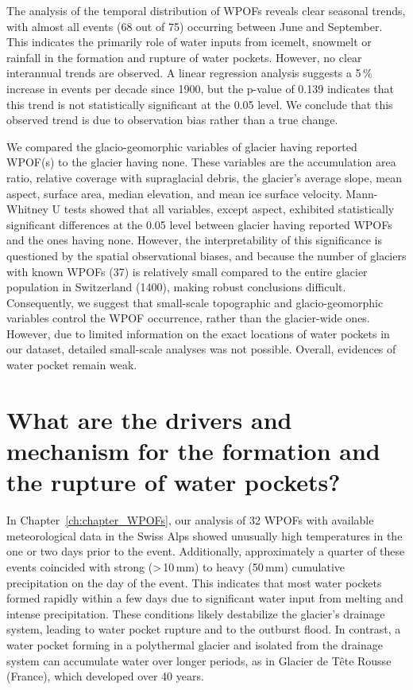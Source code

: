 The analysis of the temporal distribution of WPOFs reveals clear seasonal trends, with almost all events (68 out of 75) occurring between June and September. This indicates the primarily role of water inputs from icemelt, snowmelt or rainfall in the formation and rupture of water pockets. However, no clear interannual trends are observed. A linear regression analysis suggests a 5\,\% increase in events per decade since 1900, but the p-value of 0.139 indicates that this trend is not statistically significant at the 0.05 level. We conclude that this observed trend is due to observation bias rather than a true change.
%

We compared the glacio-geomorphic variables of glacier having reported WPOF(s) to the glacier having none. These variables are the accumulation area ratio, relative coverage with supraglacial debris, the glacier's average slope, mean aspect, surface area, median elevation, and mean ice surface velocity. Mann-Whitney U tests showed that all variables, except aspect, exhibited statistically significant differences at the 0.05 level between glacier having reported WPOFs and the ones having none. However, the interpretability of this significance is questioned by the spatial observational biases, and because the number of glaciers with known WPOFs (37) is relatively small compared to the entire glacier population in Switzerland (1400), making robust conclusions difficult. Consequently, we suggest that small-scale topographic and glacio-geomorphic variables control the WPOF occurrence, rather than the glacier-wide ones. However, due to limited information on the exact locations of water pockets in our dataset, detailed small-scale analyses was not possible. Overall, evidences of water pocket remain weak.
%


\section{What are the drivers and mechanism for the formation and the rupture of water pockets?}

In Chapter~\ref{ch:chapter_WPOFs}, our analysis of 32 WPOFs with available meteorological data in the Swiss Alps showed unusually high temperatures in the one or two days prior to the event. Additionally, approximately a quarter of these events coincided with strong (>\,10\,mm) to heavy (50\,mm) cumulative precipitation on the day of the event. This indicates that most water pockets formed rapidly within a few days due to significant water input from melting and intense precipitation. These conditions likely destabilize the glacier's drainage system, leading to water pocket rupture and to the outburst flood. In contrast, a water pocket forming in a polythermal glacier and isolated from the drainage system can accumulate water over longer periods, as in Glacier de Tête Rousse (France), which developed over 40 years.  
%

